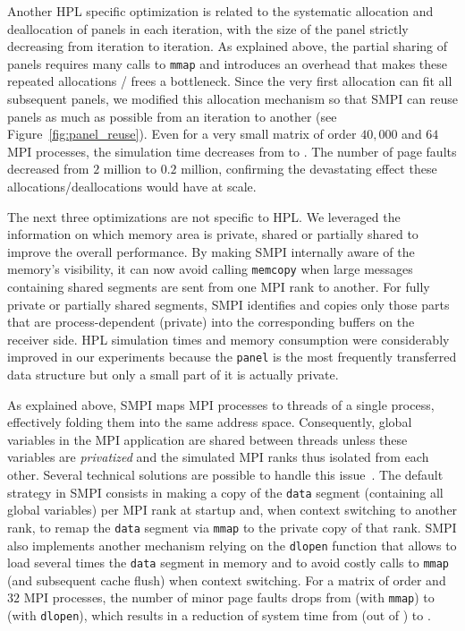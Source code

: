         Another HPL specific optimization is related to the systematic allocation and deallocation of panels in each
        iteration, with the size of the panel strictly decreasing from iteration to iteration. As explained above,
        the partial sharing of panels requires many calls to \texttt{mmap} and introduces an overhead that makes these
        repeated allocations / frees a bottleneck. Since the very first allocation can fit all subsequent panels, we
        modified this allocation mechanism so that SMPI can reuse panels as much as possible from an iteration to another
        (see Figure~\ref{fig:panel_reuse}). Even for a very small matrix of order \(40,000\) and \(64\) MPI
        processes, the simulation time decreases from  to .  The number of page faults
        decreased from \(2\) million to \(0.2\) million, confirming the devastating effect these
        allocations/deallocations would have at scale.

        The next three optimizations are not specific to HPL.  We leveraged the information on which memory area is
        private, shared or partially shared to improve the overall performance.  By making SMPI internally aware of the
        memory's visibility, it can now avoid calling \texttt{memcopy} when large messages containing shared segments
        are sent from one MPI rank to another.  For fully private or partially shared segments, SMPI identifies and
        copies only those parts that are process-dependent (private) into the corresponding buffers on the receiver
        side.  HPL simulation times and memory consumption were considerably improved in our experiments because the
        \texttt{panel} is the most frequently transferred data structure but only a small part of it is actually
        private.

        As explained above, SMPI maps MPI processes to threads of a single process, effectively folding them into the
        same address space.  Consequently, global variables in the MPI application are shared between threads unless
        these variables are \emph{privatized} and the simulated MPI ranks thus isolated from each other. Several
        technical solutions are possible to handle this issue~\cite{smpi}. The default strategy in SMPI consists in
        making a copy of the \texttt{data} segment (containing all global variables) per MPI rank at startup and, when
        context switching to another rank, to remap the \texttt{data} segment via \texttt{mmap} to the private copy of
        that rank.  SMPI also implements another mechanism relying on the \texttt{dlopen} function that allows to load
        several times the \texttt{data} segment in memory and to avoid costly calls to \texttt{mmap} (and subsequent
        cache flush) when context switching. For a matrix of order  and \(32\) MPI processes, the number of
        minor page faults drops from  (with \texttt{mmap}) to  (with \texttt{dlopen}), which
        results in a reduction of system time from  (out of ) to .

